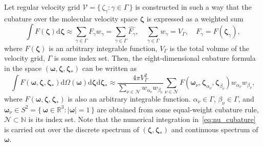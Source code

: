 \documentclass[10pt]{article}
\newcommand{\dd}{\mathrm{d}}
\newcommand{\dzeta}{\boldsymbol{\dd\zeta}}
\newcommand{\bzeta}{\boldsymbol{\zeta}}
\newcommand{\Nu}{\mathcal{N}}
\newcommand{\Set}[2]{\{\,{#1}:{#2}\,\}}
\begin{document}
Let regular velocity grid \(\mathcal{V} = \Set{\zeta_\gamma}{\gamma\in\Gamma}\) is constructed in such a way
that the cubature over the molecular velocity space \(\bzeta\) is expressed as a weighted sum
\begin{equation}\label{eq:bzeta_cubature}
    \int F(\bzeta) \dzeta \approx \sum_{\gamma\in\Gamma} F_\gamma w_\gamma =
        \sum_{\gamma\in\Gamma} \hat{F_\gamma}, \quad
    \sum_{\gamma\in\Gamma} w_\gamma = V_\Gamma, \quad
    F_\gamma = F(\bzeta_\gamma),
\end{equation}
where \(F(\bzeta)\) is an arbitrary integrable function, \(V_\Gamma\) is the total volume of the velocity grid,
\(\Gamma\) is some index set.
Then, the eight-dimensional cubature formula in the space \((\boldsymbol{\omega},\bzeta,\bzeta_*)\) can be written as
\begin{equation}\label{eq:nu_cubature}
    \int F(\boldsymbol{\omega},\bzeta,\bzeta_*) \dd\Omega(\boldsymbol{\omega})\dzeta\dzeta_* \approx
        \frac{4\pi V_\Gamma^2}{ \sum_{\nu\in\Nu} w_{\alpha_\nu}w_{\beta_\nu} }
        \sum_{\nu\in\Nu} F(\boldsymbol{\omega}_\nu,\bzeta_{\alpha_\nu},\bzeta_{\beta_\nu}) w_{\alpha_\nu}w_{\beta_\nu},
\end{equation}
where \(F(\boldsymbol{\omega},\bzeta,\bzeta_*)\) is also an arbitrary integrable function.
\(\alpha_\nu\in\Gamma\), \(\beta_\nu\in\Gamma\),
and \(\boldsymbol{\omega}_\nu\in S^2 = \Set{\boldsymbol{\omega}\in\mathbb{R}^3}{|\boldsymbol{\omega}| = 1}\)
are obtained from some equal-weight cubature rule,
\(\Nu\subset\mathbb{N}\) is its index set.
Note that the numerical integration in~\eqref{eq:nu_cubature} is carried out over
the discrete spectrum of \((\bzeta,\bzeta_*)\) and continuous spectrum of \(\boldsymbol{\omega}\).
\end{document}
